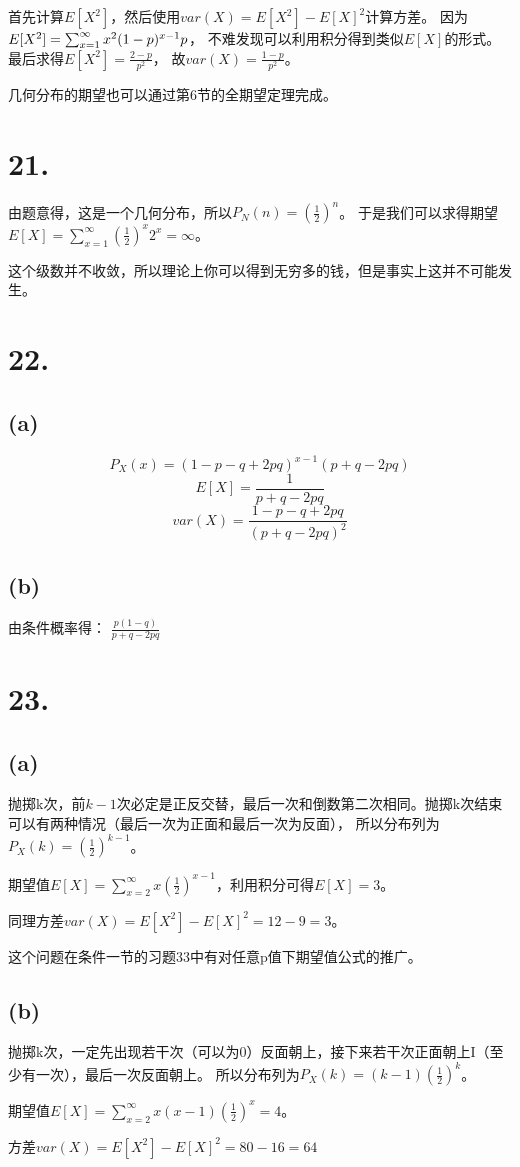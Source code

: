 \documentclass[UTF8]{report}
\begin{document}
        首先计算$E[X^2]$，然后使用$var(X) = E[X^2] - E[X]^2$计算方差。
        因为$\\E[X^2] = \sum_{x = 1}^{\infty}x^2(1 - p)^{x - 1}p$，
        不难发现可以利用积分得到类似$E[X]$的形式。最后求得$E[X^2] = \frac{2 - p}{p^2}$，
        故$var(X) = \frac{1 - p}{p^2}$。

        几何分布的期望也可以通过第6节的全期望定理完成。
    \section*{21.}
        由题意得，这是一个几何分布，所以$P_N(n) = (\frac{1}{2})^n$。
        于是我们可以求得期望$E[X] = \sum_{x = 1}^{\infty}(\frac{1}{2})^x2^x = \infty$。

        这个级数并不收敛，所以理论上你可以得到无穷多的钱，但是事实上这并不可能发生。
    \section*{22.}
        \subsection*{(a)}
            $$P_X(x) = (1 - p - q + 2pq)^{x - 1}(p + q - 2pq)$$
            $$E[X] = \frac{1}{p + q -2pq}$$
            $$var(X) = \frac{1 - p - q + 2pq}{(p + q - 2pq)^2}$$
        \subsection*{(b)}
            由条件概率得：
            $\frac{p(1 - q)}{p + q - 2pq}$
    \section*{23.}
        \subsection*{(a)}
            抛掷k次，前$k - 1$次必定是正反交替，最后一次和倒数第二次相同。抛掷k次结束可以有两种情况（最后一次为正面和最后一次为反面），
            所以分布列为$P_X(k) = (\frac{1}{2})^{k - 1}$。

            期望值$E[X] = \sum_{x = 2}^{\infty}x(\frac{1}{2})^{x - 1}$，利用积分可得$E[X] = 3$。

            同理方差$var(X) = E[X^2] - E[X]^2 = 12 - 9 = 3$。

            这个问题在条件一节的习题33中有对任意p值下期望值公式的推广。
        \subsection*{(b)}
            抛掷k次，一定先出现若干次（可以为0）反面朝上，接下来若干次正面朝上I（至少有一次），最后一次反面朝上。
            所以分布列为$P_X(k) = (k - 1)(\frac{1}{2})^k$。

            期望值$E[X] = \sum_{x = 2}^{\infty}x(x - 1)(\frac{1}{2})^x = 4$。

            方差$var(X) = E[X^2] - E[X]^2 = 80 - 16 = 64$
\end{document}
